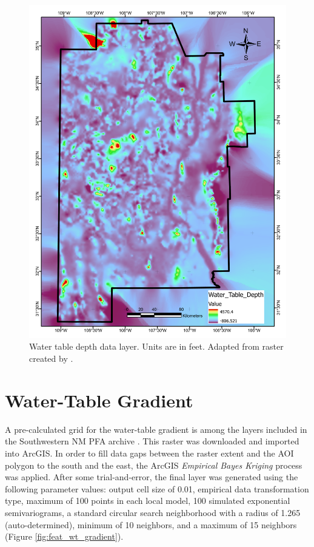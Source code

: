 \begin{figure}[H]
\centering
\includegraphics[width=0.75\linewidth]{templates/images/Figure-WTDepth.pdf}
\caption[Water table depth data layer]{Water table depth data layer. Units are in feet. Adapted from raster created by \protect\citep{bielicki_hydrogeolgic_2015}.}
\label{fig:feat_wtdepth}
\end{figure}
\pagebreak

\section{Water-Table Gradient}\label{app:dl_wt_gradient}
A pre-calculated grid for the water-table gradient is among the layers included in the Southwestern NM PFA archive \citep{kelley_geothermal_2015}. This raster was downloaded and imported into ArcGIS. In order to fill data gaps between the raster extent and the AOI polygon to the south and the east, the ArcGIS \textit{Empirical Bayes Kriging} process was applied. After some trial-and-error, the final layer was generated using the following parameter values: output cell size of 0.01, empirical data transformation type, maximum of 100 points in each local model, 100 simulated exponential semivariograms, a standard circular search neighborhood with a radius of 1.265 (auto-determined), minimum of 10 neighbors, and a maximum of 15 neighbors (Figure \ref{fig:feat_wt_gradient}).
\vfill
\pagebreak


